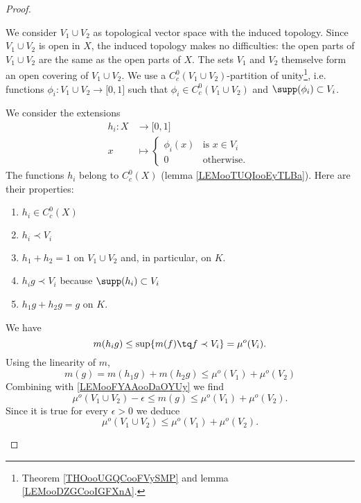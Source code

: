 \begin{proof}
\begin{subproof}
        We consider \( V_1\cup V_2\) as topological vector space with the induced topology. Since \( V_1\cup V_2\) is open in \( X\), the induced topology makes no difficulties: the open parts of \( V_1\cup V_2\) are the same as the open parts of \( X\). The sets \( V_1\) and \( V_2\) themselve form an open covering of \( V_1\cup V_2\). We use a \( C_c^0(V_1\cup V_2)\)-partition of unity\footnote{Theorem \ref{THOooUGQCooFVySMP} and lemma \ref{LEMooDZGCooIGFXnA}.}, i.e. functions \( \phi_i\colon V_1\cup V_2\to \mathopen[ 0 , 1 \mathclose]\) such that \( \phi_i\in C^0_c(V_1\cup V_2)\) and \( \supp(\phi_i)\subset V_i\). 

        We consider the extensions
        \begin{equation}
            \begin{aligned}
                h_i\colon X&\to \mathopen[ 0 , 1 \mathclose] \\
                x&\mapsto \begin{cases}
                    \phi_i(x)    &   \text{is } x\in V_i\\
                    0    &    \text{otherwise. }
                \end{cases}
            \end{aligned}
        \end{equation}
        The functions \( h_i\) belong to \( C^0_c(X)\) (lemma \ref{LEMooTUQIooEyTLBa}). Here are their properties:
        \begin{enumerate}
            \item
                \( h_i\in C^0_c(X)\)
            \item
                \( h_i\prec V_i\)
            \item
                \( h_1+h_2=1\) on \( V_1\cup V_2\) and, in particular, on \( K\).
            \item
                \( h_ig\prec V_i\) because \( \supp(h_i)\subset V_i\)
            \item
                \( h_1g+h_2g=g\) on \( K \).
        \end{enumerate}
        We have
        \begin{equation}
            m(h_ig)\leq \sup\{ m(f)\tq f\prec V_i \}=\mu^o(V_i).
        \end{equation}
        Using the linearity of \( m\),
        \begin{equation}
            m(g)=m(h_1g)+m(h_2g)\leq \mu^o(V_1)+\mu^o(V_2)
        \end{equation}
        Combining with \eqref{LEMooFYAAooDaOYUy} we find
        \begin{equation}
            \mu^o(V_1\cup V_2)-\epsilon\leq m(g)\leq \mu^o(V_1)+\mu^o(V_2).
        \end{equation}
        Since it is true for every \( \epsilon>0\) we deduce
        \begin{equation}
            \mu^o(V_1\cup V_2)\leq \mu^o(V_1)+\mu^o(V_2).
        \end{equation}
        

\end{subproof}
\end{proof}
